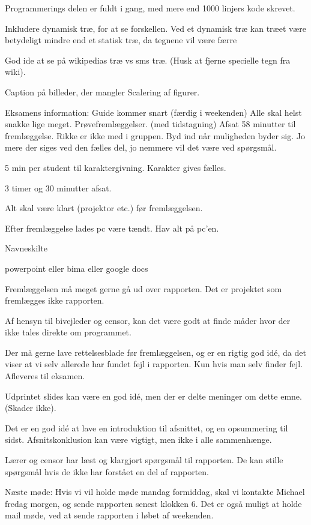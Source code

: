 Programmerings delen er fuldt i gang, med mere end 1000 linjers kode skrevet.

Inkludere dynamisk træ, for at se forskellen.
Ved et dynamisk træ kan træet være betydeligt mindre end et statisk træ, da tegnene vil være færre

God ide at se på wikipedias træ vs sms træ. (Husk at fjerne specielle tegn fra wiki).

Caption på billeder, der mangler
Scalering af figurer.

Eksamens information:
Guide kommer snart (færdig i weekenden)
Alle skal helst snakke lige meget.
Prøvefremlæggelser. (med tidstagning)
Afsat 58 minutter til fremlæggelse.
Rikke er ikke med i gruppen.
Byd ind når muligheden byder sig. Jo mere der siges ved den fælles del, jo nemmere vil det være ved spørgsmål.

5 min per student til karaktergivning.
Karakter gives fælles.

3 timer og 30 minutter afsat.

Alt skal være klart (projektor etc.) før fremlæggelsen.

Efter fremlæggelse lades pc være tændt.
Hav alt på pc'en.

Navneskilte

powerpoint eller bima eller google docs

Fremlæggelsen må meget gerne gå ud over rapporten. Det er projektet som fremlægges ikke rapporten.

Af hensyn til bivejleder og censor, kan det være godt at finde måder hvor der ikke tales direkte om programmet.

Der må gerne lave rettelsesblade før fremlæggelsen, og er en rigtig god idé, da det viser at vi selv allerede har fundet fejl i rapporten. Kun hvis man selv finder fejl. Afleveres til eksamen.

Udprintet slides kan være en god idé, men der er delte meninger om dette emne. (Skader ikke).

Det er en god idé at lave en introduktion til afsnittet, og en opsummering til sidst.
Afsnitskonklusion kan være vigtigt, men ikke i alle sammenhænge.

Lærer og censor har læst og klargjort spørgsmål til rapporten.
De kan stille spørgsmål hvis de ikke har forstået en del af rapporten.

Næste møde:
Hvis vi vil holde møde mandag formiddag, skal vi kontakte Michael fredag morgen, og sende rapporten senest klokken 6.
Det er også muligt at holde mail møde, ved at sende rapporten i løbet af weekenden.